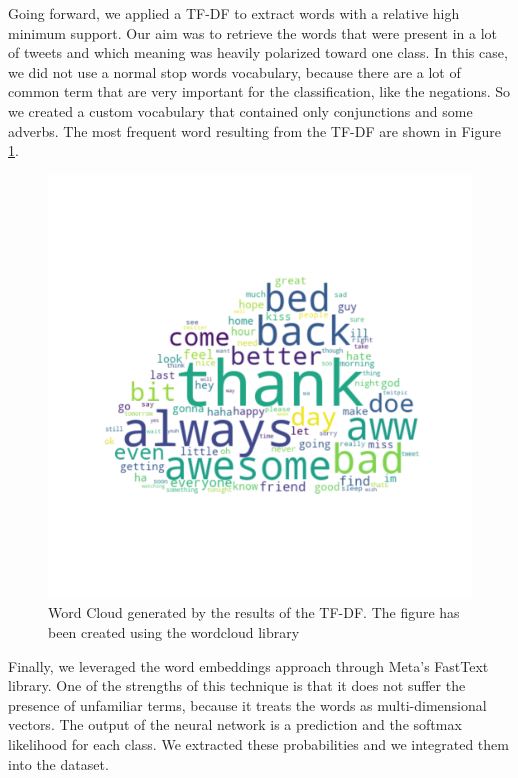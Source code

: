 \documentclass[conference]{IEEEtran}
\begin{document}
Going forward, we applied a TF-DF to extract words with a relative high minimum support. Our aim was to retrieve the words that were present in a lot of tweets and which meaning was heavily polarized toward one class. In this case, we did not use a normal stop words vocabulary, because there are a lot of common term that are very important for the classification, like the negations. So we created a custom vocabulary that contained only conjunctions and some adverbs. The most frequent word resulting from the TF-DF are shown in Figure \ref{fig:word_cloud}.
\begin{figure}[h]
        \centering
        \includegraphics[width=\columnwidth]{word_cloud}
        \caption{Word Cloud generated by the results of the TF-DF. The figure has been created using the wordcloud library\cite{word_cloud}}
        \label{fig:word_cloud}
\end{figure}

Finally, we leveraged the word embeddings approach through Meta's FastText library. %
One of the strengths of this technique is that it does not suffer the presence of unfamiliar terms, because it treats the words as multi-dimensional vectors. The output of the neural network is a prediction and the softmax likelihood for each class. We extracted these probabilities and we integrated them into the dataset.
\end{document}

